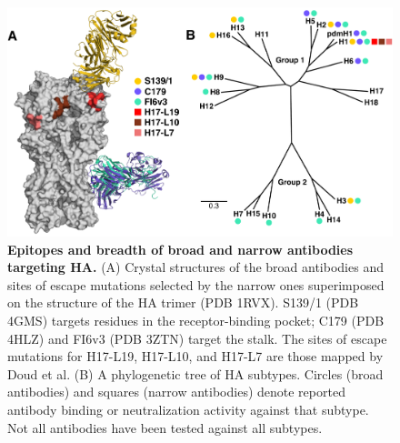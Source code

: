 \documentclass[11pt]{article}
\begin{document}
\clearpage


\begin{figure}
\centerline{\includegraphics[width=\textwidth]{Fig2.pdf}}
\caption{\label{fig:antibody_summary}
{\bf Epitopes and breadth of broad and narrow antibodies targeting HA.}
(A) Crystal structures of the broad antibodies and sites of escape mutations selected by the narrow ones superimposed on the structure of the HA trimer (PDB 1RVX\cite{gamblin2004structure}). 
S139/1 (PDB 4GMS\cite{lee2012heterosubtypic}) targets residues in the receptor-binding pocket; C179 (PDB 4HLZ\cite{dreyfus2013structure}) and FI6v3 (PDB 3ZTN\cite{corti2011neutralizing}) target the stalk. 
The sites of escape mutations for H17-L19, H17-L10, and H17-L7 are those mapped by Doud et al\cite{doud2017complete}. 
(B) A phylogenetic tree of HA subtypes.
Circles (broad antibodies) and squares (narrow antibodies) denote reported antibody binding or neutralization activity against that subtype. 
Not all antibodies have been tested against all subtypes. 
}
\end{figure}

\clearpage
\end{document}
